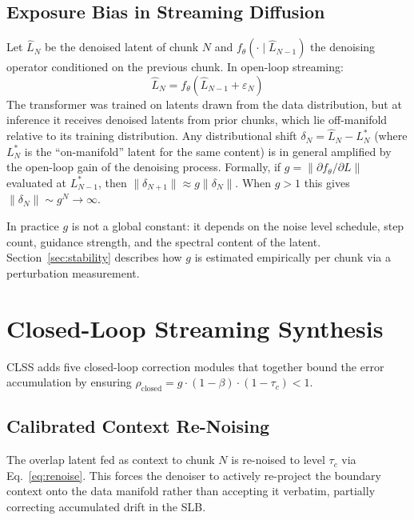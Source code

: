 \documentclass[12pt]{article}
\begin{document}
\subsection{Exposure Bias in Streaming Diffusion}
Let $\hat{L}_N$ be the denoised latent of chunk $N$ and
$f_\theta(\cdot\mid\hat{L}_{N-1})$ the denoising operator conditioned on the
previous chunk.  In open-loop streaming:
\begin{equation}
\hat{L}_N = f_\theta(\hat{L}_{N-1} + \varepsilon_N)
\end{equation}
The transformer was trained on latents drawn from the data distribution, but at
inference it receives denoised latents from prior chunks, which lie
off-manifold relative to its training distribution.  Any distributional shift
$\delta_N = \hat{L}_N - L_N^*$ (where $L_N^*$ is the ``on-manifold'' latent
for the same content) is in general amplified by the open-loop gain of the
denoising process.  Formally, if $g = \|\partial f_\theta / \partial L\|$
evaluated at $L_{N-1}^*$, then $\|\delta_{N+1}\| \approx g\|\delta_N\|$.
When $g > 1$ this gives $\|\delta_N\| \sim g^N \to \infty$.

In practice $g$ is not a global constant: it depends on the noise level
schedule, step count, guidance strength, and the spectral content of the
latent.  Section~\ref{sec:stability} describes how $g$ is estimated
empirically per chunk via a perturbation measurement.

\section{Closed-Loop Streaming Synthesis}
\label{sec:clss}

CLSS adds five closed-loop correction modules that together bound the error
accumulation by ensuring $\rho_{\text{closed}} = g \cdot (1-\beta)\cdot(1-\tau_c) < 1$.

\subsection{Calibrated Context Re-Noising}
\label{sec:renoise}

The overlap latent fed as context to chunk $N$ is re-noised to level $\tau_c$
via Eq.~\eqref{eq:renoise}.  This forces the denoiser to actively re-project
the boundary context onto the data manifold rather than accepting it verbatim,
partially correcting accumulated drift in the SLB.
\end{document}
